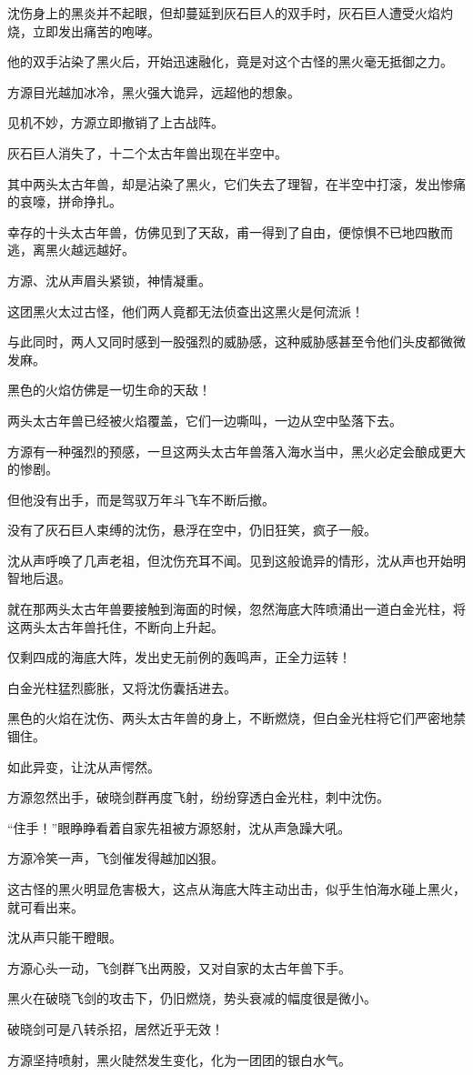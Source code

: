 \begin{this_body}
沈伤身上的黑炎并不起眼，但却蔓延到灰石巨人的双手时，灰石巨人遭受火焰灼烧，立即发出痛苦的咆哮。

他的双手沾染了黑火后，开始迅速融化，竟是对这个古怪的黑火毫无抵御之力。

方源目光越加冰冷，黑火强大诡异，远超他的想象。

见机不妙，方源立即撤销了上古战阵。

灰石巨人消失了，十二个太古年兽出现在半空中。

其中两头太古年兽，却是沾染了黑火，它们失去了理智，在半空中打滚，发出惨痛的哀嚎，拼命挣扎。

幸存的十头太古年兽，仿佛见到了天敌，甫一得到了自由，便惊惧不已地四散而逃，离黑火越远越好。

方源、沈从声眉头紧锁，神情凝重。

这团黑火太过古怪，他们两人竟都无法侦查出这黑火是何流派！

与此同时，两人又同时感到一股强烈的威胁感，这种威胁感甚至令他们头皮都微微发麻。

黑色的火焰仿佛是一切生命的天敌！

两头太古年兽已经被火焰覆盖，它们一边嘶叫，一边从空中坠落下去。

方源有一种强烈的预感，一旦这两头太古年兽落入海水当中，黑火必定会酿成更大的惨剧。

但他没有出手，而是驾驭万年斗飞车不断后撤。

没有了灰石巨人束缚的沈伤，悬浮在空中，仍旧狂笑，疯子一般。

沈从声呼唤了几声老祖，但沈伤充耳不闻。见到这般诡异的情形，沈从声也开始明智地后退。

就在那两头太古年兽要接触到海面的时候，忽然海底大阵喷涌出一道白金光柱，将这两头太古年兽托住，不断向上升起。

仅剩四成的海底大阵，发出史无前例的轰鸣声，正全力运转！

白金光柱猛烈膨胀，又将沈伤囊括进去。

黑色的火焰在沈伤、两头太古年兽的身上，不断燃烧，但白金光柱将它们严密地禁锢住。

如此异变，让沈从声愕然。

方源忽然出手，破晓剑群再度飞射，纷纷穿透白金光柱，刺中沈伤。

“住手！”眼睁睁看着自家先祖被方源怒射，沈从声急躁大吼。

方源冷笑一声，飞剑催发得越加凶狠。

这古怪的黑火明显危害极大，这点从海底大阵主动出击，似乎生怕海水碰上黑火，就可看出来。

沈从声只能干瞪眼。

方源心头一动，飞剑群飞出两股，又对自家的太古年兽下手。

黑火在破晓飞剑的攻击下，仍旧燃烧，势头衰减的幅度很是微小。

破晓剑可是八转杀招，居然近乎无效！

方源坚持喷射，黑火陡然发生变化，化为一团团的银白水气。

\end{this_body}

